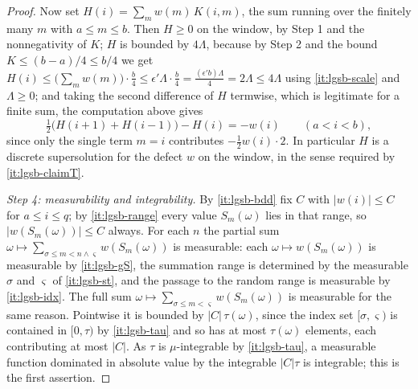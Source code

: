 \begin{proof}
Now set $H(i)=\sum_{m}w(m)\,K(i,m)$, the sum running over the finitely many
$m$ with $a\le m\le b$. Then $H\ge0$ on the window, by Step 1 and the
nonnegativity of $K$; $H$ is bounded by $4\Lambda$, because by Step 2 and the
bound $K\le(b-a)/4\le b/4$ we get
$H(i)\le\bigl(\sum_mw(m)\bigr)\cdot\frac b4\le\epsilon'\Lambda\cdot\frac b4
=\frac{(\epsilon'b)\Lambda}4=2\Lambda\le4\Lambda$ using
\ref{it:lgsb-scale} and $\Lambda\ge0$; and taking the second difference of $H$
termwise, which is legitimate for a finite sum, the computation above gives
\begin{equation}\label{eq:lgsb-super}
  \tfrac12\bigl(H(i+1)+H(i-1)\bigr)-H(i)=-w(i)\qquad(a<i<b),
\end{equation}
since only the single term $m=i$ contributes $-\tfrac12w(i)\cdot 2$. In
particular $H$ is a discrete supersolution for the defect $w$ on the window, in
the sense required by \ref{it:lgsb-claimT}.

\emph{Step 4: measurability and integrability.} By \ref{it:lgsb-bdd} fix $C$
with $|w(i)|\le C$ for $a\le i\le q$; by \ref{it:lgsb-range} every value
$S_m(\omega)$ lies in that range, so $|w(S_m(\omega))|\le C$ always. For each
$n$ the partial sum $\omega\mapsto\sum_{\sigma\le m<n\wedge\varsigma}
w(S_m(\omega))$ is measurable: each $\omega\mapsto w(S_m(\omega))$ is
measurable by \ref{it:lgsb-gS}, the summation range is determined by the
measurable $\sigma$ and $\varsigma$ of \ref{it:lgsb-st}, and the passage to the
random range is measurable by \ref{it:lgsb-idx}. The full sum
$\omega\mapsto\sum_{\sigma\le m<\varsigma}w(S_m(\omega))$ is measurable for the
same reason. Pointwise it is bounded by $|C|\,\tau(\omega)$, since the index set
$[\sigma,\varsigma)$ is contained in $[0,\tau)$ by \ref{it:lgsb-tau} and so has
at most $\tau(\omega)$ elements, each contributing at most $|C|$. As
$\tau$ is $\mu$-integrable by \ref{it:lgsb-tau}, a measurable function
dominated in absolute value by the integrable $|C|\tau$ is integrable; this is
the first assertion.


\end{proof}
